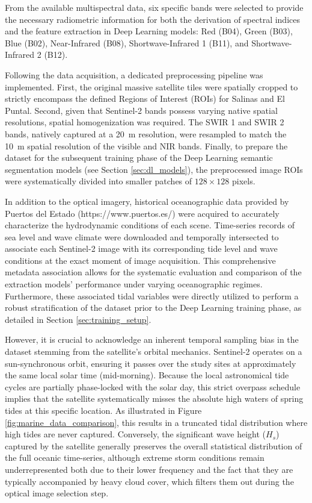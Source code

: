 ﻿\documentclass[ENG]{TFUOC}%
\begin{document}
From the available multispectral data, six specific bands were selected to provide the necessary radiometric information for both the derivation of spectral indices and the feature extraction in Deep Learning models: Red (B04), Green (B03), Blue (B02), Near-Infrared (B08), Shortwave-Infrared 1 (B11), and Shortwave-Infrared 2 (B12). 

Following the data acquisition, a dedicated preprocessing pipeline was implemented. First, the original massive satellite tiles were spatially cropped to strictly encompass the defined Regions of Interest (ROIs) for Salinas and El Puntal. Second, given that Sentinel-2 bands possess varying native spatial resolutions, spatial homogenization was required. The SWIR 1 and SWIR 2 bands, natively captured at a 20~m resolution, were resampled to match the 10~m spatial resolution of the visible and NIR bands. Finally, to prepare the dataset for the subsequent training phase of the Deep Learning semantic segmentation models (see Section \ref{sec:dl_models}), the preprocessed image ROIs were systematically divided into smaller patches of $128 \times 128$ pixels.

In addition to the optical imagery, historical oceanographic data provided by Puertos del Estado (https://www.puertos.es/) were acquired to accurately characterize the hydrodynamic conditions of each scene. Time-series records of sea level and wave climate were downloaded and temporally intersected to associate each Sentinel-2 image with its corresponding tide level and wave conditions at the exact moment of image acquisition. This comprehensive metadata association allows for the systematic evaluation and comparison of the extraction models' performance under varying oceanographic regimes. Furthermore, these associated tidal variables were directly utilized to perform a robust stratification of the dataset prior to the Deep Learning training phase, as detailed in Section \ref{sec:training_setup}.

However, it is crucial to acknowledge an inherent temporal sampling bias in the dataset stemming from the satellite's orbital mechanics. Sentinel-2 operates on a sun-synchronous orbit, ensuring it passes over the study sites at approximately the same local solar time (mid-morning). Because the local astronomical tide cycles are partially phase-locked with the solar day, this strict overpass schedule implies that the satellite systematically misses the absolute high waters of spring tides at this specific location. As illustrated in Figure \ref{fig:marine_data_comparison}, this results in a truncated tidal distribution where high tides are never captured. Conversely, the significant wave height ($H_s$) captured by the satellite generally preserves the overall statistical distribution of the full oceanic time-series, although extreme storm conditions remain underrepresented both due to their lower frequency and the fact that they are typically accompanied by heavy cloud cover, which filters them out during the optical image selection step.
\end{document}
